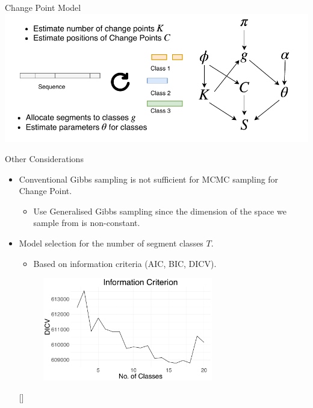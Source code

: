 \documentclass{beamer}
\begin{document}
    \begin{frame}{Change Point Model}
        \includegraphics[width=\textwidth]{ChangePoint.pdf}
    \end{frame}
    \begin{frame}{Other Considerations}
        \begin{itemize}
            \item Conventional Gibbs sampling is not sufficient for MCMC sampling for Change Point.
                \pause
                \begin{itemize}
                    \item Use Generalised Gibbs sampling since the dimension of the space we sample from is non-constant.
                \end{itemize}
                \pause
            \item Model selection for the number of segment classes $T$.
                \pause
                \begin{itemize}
                    \item Based on information criteria (AIC, BIC, DICV).
                \end{itemize}
                
                \begin{figure}
                    \centering
                    \includegraphics[width=0.7\textwidth]{DICVtbx3.pdf}
                    \label{fig:my_label}
                \end{figure}[]
        \end{itemize}
        
    
        
    \end{frame}
    
\end{document}
